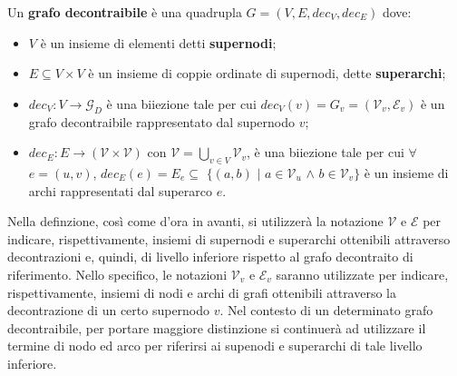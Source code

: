     \begin{definition}
        Un \textbf{grafo decontraibile} \`e una quadrupla $G = (V, E, dec_V, dec_E)$ dove:
        \begin{itemize}
            \item $V$ \`e un insieme di elementi detti \textbf{supernodi};
            \item $E \subseteq V \times V$ \`e un insieme di coppie ordinate di supernodi, dette \textbf{superarchi};
            \item $dec_V : V \rightarrow \mathcal{G}_D$ \`e una biiezione tale per cui $dec_V(v) = G_v = (\mathcal{V}_v,
                \mathcal{E}_v)$ \`e un grafo decontraibile rappresentato dal supernodo $v$;
            \item $dec_E : E \rightarrow (\mathcal{V} \times \mathcal{V})$ con $\mathcal{V} = \bigcup_{v \in V}\mathcal{V}_v$,
                \`e una biiezione tale per cui $\forall$ $ e = (u, v)$, $dec_E(e) = E_e \subseteq$ $\{(a, b)$ $\mid$ $a \in \mathcal{V}_u$ $\wedge$
                $b \in \mathcal{V}_v\}$ \`e un insieme di archi rappresentati dal superarco $e$.
        \end{itemize}
    \end{definition}

    Nella definzione, cos\`{i} come d'ora in avanti, si utilizzer\`a la notazione $\mathcal{V}$ e $\mathcal{E}$ per
    indicare, rispettivamente, insiemi di supernodi e superarchi ottenibili attraverso decontrazioni e, quindi, di
    livello inferiore rispetto al grafo decontraito di riferimento.
    Nello specifico, le notazioni $\mathcal{V}_v$ e $\mathcal{E}_v$ saranno utilizzate per indicare, rispettivamente,
    insiemi di nodi e archi di grafi ottenibili attraverso la decontrazione di un certo supernodo $v$.
    Nel contesto di un determinato grafo decontraibile, per portare maggiore distinzione si continuer\`a ad utilizzare
    il termine di nodo ed arco per riferirsi ai supenodi e superarchi di tale livello inferiore. \newline


